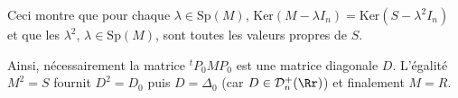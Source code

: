 {\begin{enumerate}
{Ceci montre que pour chaque $\lambda\in\text{Sp}(M)$, $\text{Ker}(M-\lambda I_n)=\text{Ker}(S-\lambda^2I_n)$ et que les $\lambda^2$, $\lambda\in\text{Sp}(M)$, sont toutes les valeurs propres de $S$.

Ainsi, nécessairement la matrice ${^t}P_0MP_0$ est une matrice diagonale $D$. L'égalité $M^2=S$ fournit $D^2=D_0$ puis $D=\Delta_0$ (car $D\in\mathcal{D}_n^+(\Rr)$) et finalement $M = R$.

\begin{center}
\end{center}}
\end{enumerate}
}

